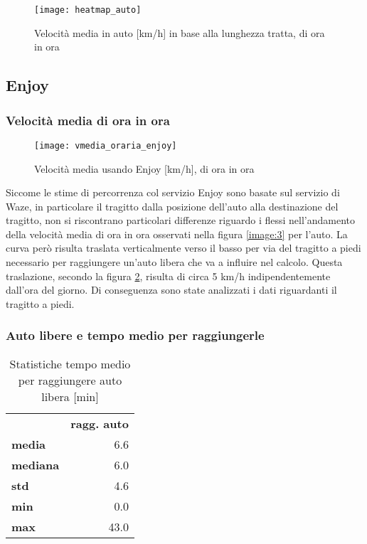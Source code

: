 \begin{figure}[H]
\texttt{[image: heatmap\_auto]}
\caption{Velocità media in auto [km/h] in base alla lunghezza tratta, di ora in ora}
\label{image:6}
\end{figure}


\subsection{Enjoy}

\subsubsection{Velocità media di ora in ora}

\begin{figure}[H]
\texttt{[image: vmedia\_oraria\_enjoy]}
\caption{Velocità media usando Enjoy [km/h], di ora in ora}
\label{image:7}
\end{figure}

Siccome le stime di percorrenza col servizio Enjoy sono basate sul servizio di Waze, in particolare il tragitto dalla posizione dell'auto alla destinazione del tragitto, non si riscontrano particolari differenze riguardo i flessi nell'andamento della velocità media di ora in ora osservati nella figura \ref{image:3} per l'auto. La curva però risulta traslata verticalmente verso il basso per via del tragitto a piedi necessario per raggiungere un'auto libera che va a influire nel calcolo. Questa traslazione, secondo la figura \ref{image:7}, risulta di circa 5 km/h indipendentemente dall'ora del giorno. Di conseguenza sono state analizzati i dati riguardanti il tragitto a piedi.

\subsubsection{Auto libere e tempo medio per raggiungerle}

\begin{table}[H]
\centering
\begin{tabular}{ | l r | }
\hline
& \textbf{ragg. auto} \\
\textbf{media}   &  6.6 \\
\textbf{mediana} &  6.0 \\
\textbf{std}     &  4.6 \\
\textbf{min}     &  0.0 \\ 
\textbf{max}     & 43.0 \\
\hline
\end{tabular}
\caption{Statistiche tempo medio per raggiungere auto libera [min]}
\label{table:4}
\end{table}

